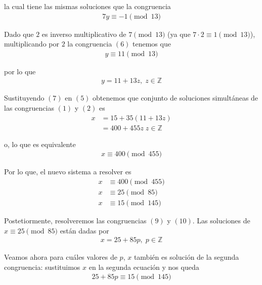 \documentclass[letterpaper,11pt]{article}
\begin{document}
\begin{enumerate}
\begin{itemize}
        la cual tiene las mismas soluciones que la congruencia
        \begin{align}
            7y \equiv -1 \pmod{13}
        \end{align}
        
        Dado que $2$ es inverso multiplicativo de $7 \pmod{13}$ (ya que 
        $7 \cdot 2 \equiv 1 \pmod{13}$), multiplicando por $2$ la congruencia
        $(6)$ tenemos que
        \begin{align*}
            y \equiv 11 \pmod{13} 
        \end{align*}
        
        por lo que
        \begin{align}
            y = 11 + 13z, \; z \in \mathbb{Z}
        \end{align}
        
        Sustituyendo $(7)$ en $(5)$ obtenemos que conjunto de soluciones 
        simultáneas de las congruencias $(1)$ y $(2)$ es 
        \begin{align*}
            x 
            &= 15 + 35(11 + 13z) \\
            &= 400 + 455z\; z \in \mathbb{Z}
        \end{align*}
        
        o, lo que es equivalente
        \begin{align*}
            x \equiv 400 \pmod{455}
        \end{align*}
        
        Por lo que, el nuevo sistema a resolver es
        \begin{align}
            x &\equiv 400 \pmod{455} \\
            x &\equiv 25 \pmod{85} \\
            x &\equiv 15 \pmod{145}
        \end{align}
        
        Postetiormente, resolveremos las congruencias $(9)$ y $(10)$. Las 
        soluciones de $x \equiv 25 \pmod{85}$ están dadas por
        \begin{align}
            x = 25 + 85p, \; p \in \mathbb{Z}
        \end{align}
        
        Veamos ahora para cuáles valores de $p$, $x$ también es solución de la 
        segunda congruencia: sustituimos $x$ en la segunda ecuación y nos queda
        \begin{align*}
            25 + 85p \equiv 15 \pmod{145}
        \end{align*}
        

\end{itemize}
\end{enumerate}
\end{document}
